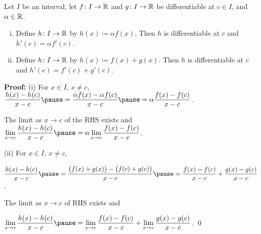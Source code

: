 \documentclass[10pt,aspectratio=169]{beamer}
\begin{document}
\begin{frame}

\begin{proposition}[Linearity]
Let $I$ be an interval, let
$f \colon I \to {\mathbb{R}}$ and $g \colon I \to {\mathbb{R}}$ be differentiable at $c \in I$,
and $\alpha \in {\mathbb{R}}$.%
\begin{enumerate}[(i)]
\item\pause
Define $h \colon I \to {\mathbb{R}}$ by $h(x) \coloneqq \alpha f(x)$.  Then
$h$ is differentiable at $c$ and
$h'(c) = \alpha f'(c)$.
\item\pause
Define $h \colon I \to {\mathbb{R}}$ by $h(x) \coloneqq  f(x) + g(x)$.  Then
$h$ is differentiable at $c$ and
$h'(c) =  f'(c) + g'(c)$.
\end{enumerate}
\end{proposition}

\pause
\textbf{Proof:}
(i) For $x \in I$, $x \not= c$,
\pause
\quad
$\displaystyle
\frac{h(x)-h(c)}{x-c}
\pause
=
\frac{\alpha f(x) - \alpha f(c)}{x-c}
\pause
=
\alpha \frac{f(x) - f(c)}{x-c}$.

\pause
\medskip

The limit as $x \to c$ of the RHS exists
\pause
and
\quad
$\displaystyle
\lim_{x\to c}\frac{h(x)-h(c)}{x-c}
\pause
=
\alpha \lim_{x\to c} \frac{f(x) - f(c)}{x-c}$.

\pause
\medskip

(ii)
For $x \in I$, $x \not= c$,

\pause
\medskip

\quad $\displaystyle
\frac{h(x)-h(c)}{x-c}
\pause
=
\frac{\bigl(f(x) + g(x)\bigr) - \bigl(f(c) + g(c)\bigr)}{x-c}
\pause
=
\frac{f(x) - f(c)}{x-c}
+
\frac{g(x) - g(c)}{x-c}$.

\pause
\medskip

The limit as $x \to c$ of RHS exists
\pause
and

\medskip
\quad $\displaystyle
\lim_{x\to c}\frac{h(x)-h(c)}{x-c}
\pause
=
\lim_{x\to c} \frac{f(x) - f(c)}{x-c}
+
\lim_{x\to c}\frac{g(x) - g(c)}{x-c}$.
\qed

\end{frame}
\end{document}
